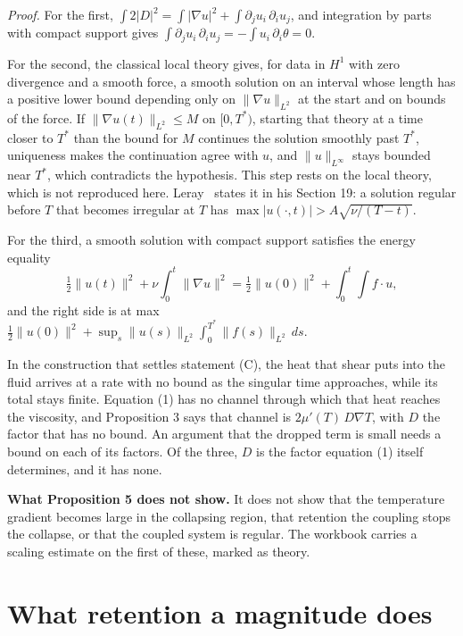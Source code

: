 \emph{Proof.} For the first,
$\int 2|D|^2 = \int|\nabla u|^2 + \int \partial_j u_i\,\partial_i u_j$, and integration by parts with
compact support gives $\int \partial_j u_i\,\partial_i u_j = -\int u_i\,\partial_i\theta = 0$.

For the second, the classical local theory gives, for data in $H^1$ with zero divergence and a smooth
force, a smooth solution on an interval whose length has a positive lower bound depending only on
$\|\nabla u\|_{L^2}$ at the start and on bounds of the force. If $\|\nabla u(t)\|_{L^2} \le M$ on
$[0,T^*)$, starting that theory at a time closer to $T^*$ than the bound for $M$ continues the
solution smoothly past $T^*$, uniqueness makes the continuation agree with $u$, and $\|u\|_{L^\infty}$
stays bounded near $T^*$, which contradicts the hypothesis. This step rests on the local theory,
which is not reproduced here. Leray~\cite{src:Leray-1934} states it in his Section 19: a solution
regular before $T$ that becomes irregular at $T$ has $\max|u(\cdot,t)| > A\sqrt{\nu/(T-t)}$.

For the third, a smooth solution with compact support satisfies the energy equality
\[
\tfrac12\|u(t)\|^2 + \nu\int_0^t\|\nabla u\|^2 = \tfrac12\|u(0)\|^2 + \int_0^t\!\!\int f\cdot u ,
\]
and the right side is at max
$\tfrac12\|u(0)\|^2 + \sup_s\|u(s)\|_{L^2}\int_0^{T^*}\|f(s)\|_{L^2}\,ds$. \hfill\qedsymbol

In the construction that settles statement (C), the heat that shear puts into the fluid arrives at a
rate with no bound as the singular time approaches, while its total stays finite. Equation (1) has
no channel through which that heat reaches the viscosity, and Proposition 3 says that channel is
$2\mu'(T)\,D\nabla T$, with $D$ the factor that has no bound. An argument that the dropped term is
small needs a bound on each of its factors. Of the three, $D$ is the factor equation (1) itself
determines, and it has none.

\textbf{What Proposition 5 does not show.} It does not show that the temperature gradient becomes
large in the collapsing region, that retention the coupling stops the collapse, or that the coupled
system is regular. The workbook carries a scaling estimate on the first of these, marked as theory.

\section{What retention a magnitude does}

